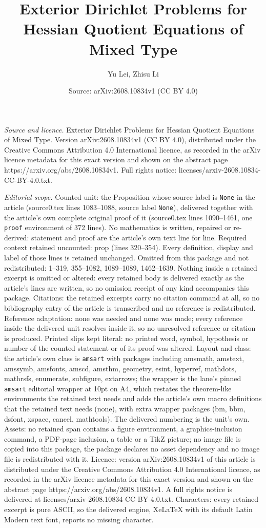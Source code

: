 \documentclass[10pt,a4paper]{amsart}
\title[Exterior Dirichlet Problems for Hessian Quotient Equations o]{Exterior Dirichlet Problems for Hessian Quotient Equations of Mixed Type}
\author{Yu Lei, Zhisu Li}
\date{Source: arXiv:2608.10834v1 (CC BY 4.0)}
\begin{document}
\maketitle

\noindent\emph{Source and licence.} Exterior Dirichlet Problems for Hessian Quotient Equations of Mixed Type. Version arXiv:2608.10834v1 (CC BY 4.0), distributed under the Creative Commons Attribution 4.0 International licence, as recorded in the arXiv licence metadata for this exact version and shown on the abstract page https://arxiv.org/abs/2608.10834v1. Full rights notice: licenses/arxiv-2608.10834-CC-BY-4.0.txt.\par\smallskip

\noindent\textit{Editorial scope.} Counted unit: the Proposition whose source label is \texttt{None} in the article (source0.tex lines 1083--1088, source label \texttt{None}), delivered together with the article's own complete original proof of it (source0.tex lines 1090--1461, one \texttt{proof} environment of 372 lines). No mathematics is written, repaired or re-derived: statement and proof are the article's own text line for line. Required context retained uncounted: prop (lines 320--354). Every definition, display and label of those lines is retained unchanged. Omitted from this package and not redistributed: 1--319, 355--1082, 1089--1089, 1462--1639. Nothing inside a retained excerpt is omitted or altered: every retained body is delivered exactly as the article's lines are written, so no omission receipt of any kind accompanies this package. Citations: the retained excerpts carry no citation command at all, so no bibliography entry of the article is transcribed and no reference is redistributed. Reference adaptation: none was needed and none was made; every reference inside the delivered unit resolves inside it, so no unresolved reference or citation is produced. Printed slips kept literal: no printed word, symbol, hypothesis or number of the counted statement or of its proof was altered. Layout and class: the article's own class is \texttt{amsart} with packages including amsmath, amstext, amssymb, amsfonts, amscd, amsthm, geometry, esint, hyperref, mathdots, mathrsfs, enumerate, subfigure, extarrows; the wrapper is the lane's pinned \texttt{amsart} editorial wrapper at 10pt on A4, which restates the theorem-like environments the retained text needs and adds the article's own macro definitions that the retained text needs (none), with extra wrapper packages (bm, bbm, dsfont, xspace, cancel, mathtools). The delivered numbering is the unit's own. Assets: no retained span contains a figure environment, a graphics-inclusion command, a PDF-page inclusion, a table or a TikZ picture; no image file is copied into this package, the package declares no asset dependency and no image file is redistributed with it. Licence: version arXiv:2608.10834v1 of this article is distributed under the Creative Commons Attribution 4.0 International licence, as recorded in the arXiv licence metadata for this exact version and shown on the abstract page https://arxiv.org/abs/2608.10834v1. A full rights notice is delivered at licenses/arxiv-2608.10834-CC-BY-4.0.txt. Characters: every retained excerpt is pure ASCII, so the delivered engine, XeLaTeX with its default Latin Modern text font, reports no missing character.
\end{document}
